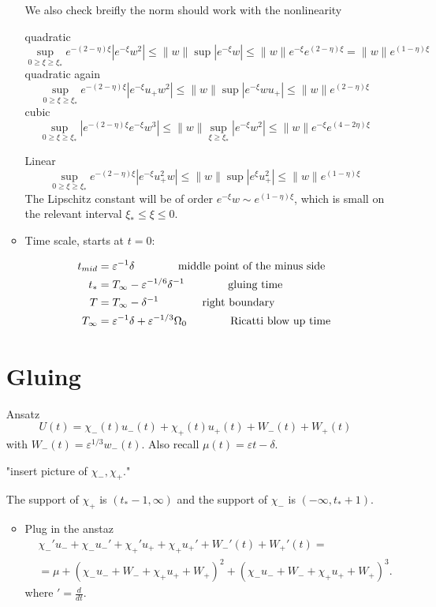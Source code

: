 \documentclass[letterpaper,11pt]{article}
\newcommand{\eps}{\varepsilon}
\numberwithin{equation}{section}
\theoremstyle{plain}
\begin{document}
\begin{enumerate}
\begin{itemize}
We also check breifly the norm should work with the nonlinearity

quadratic
\[
\sup_{0\ge \xi\ge \xi_*} e^{-(2-\eta)\xi}|e^{-\xi}w^2| \le \|w\|\sup |e^{-\xi}w| \le \|w\| e^{-\xi}e^{(2-\eta)\xi} =\|w\|e^{(1-\eta)\xi}
\]
quadratic again
\[
\sup_{0\ge \xi\ge \xi_*} e^{-(2-\eta)\xi}|e^{-\xi}u_+w^2|\le \|w\| \sup |e^{-\xi}w u_+| \le \|w\|e^{(2-\eta)\xi}
\]
cubic
\[
\sup_{0\ge \xi\ge \xi_*} |e^{-(2-\eta)\xi}e^{-\xi}w^3| \le \|w\|\sup_{\xi \ge \xi_*} |e^{-\xi} w^2| \le \|w\| e^{-\xi}e^{(4-2\eta)\xi}
\]

Linear
\[
\sup_{0\ge \xi\ge \xi_*} e^{-(2-\eta)\xi}|e^{-\xi}u_+^2w| \le \|w\| \sup |e^{\xi}u_+^2| \le \|w\|e^{(1-\eta)\xi}
\]
The Lipschitz constant will be of order $e^{-\xi}w \sim e^{(1-\eta)\xi}$, which is small on the relevant interval $\xi_* \le \xi \le 0$.

\item Time scale, starts at $t=0$:

\begin{align*}
t_{mid} &= \eps^{-1}\delta  \hspace{0.5in} \text{ middle point of the minus side}\\
t_* &=  T_\infty - \eps^{-1/6}\delta^{-1} \hspace{0.5in} \text{ gluing time}\\
T & = T_\infty - \delta^{-1} \hspace{0.5in} \text{ right boundary  }\\
T_{\infty} &= \eps^{-1}\delta + \eps^{-1/3}\Omega_0 \hspace{0.5in}  \text{ Ricatti blow up time}
\end{align*}
\pagebreak

\end{itemize}

\section{Gluing}
Ansatz
\[
U(t) = \chi_-(t)u_-(t) + \chi_+(t)u_+(t) + W_-(t)+W_+(t)
\]
with $W_-(t) = \eps^{1/3}w_-(t)$. Also recall $\mu(t) = \eps t- \delta$.

"insert picture of $\chi_-,\chi_+$."

The support of $\chi_+$ is $(t_*-1,\infty)$ and  the support of $\chi_-$ is $(-\infty, t_*+1)$.

\begin{itemize}
\item 
Plug in the anstaz
\begin{align*}
&\chi_-' u_- + \chi_- u_-' + \chi_+' u_+ + \chi_+ u_+' +W_-'(t)+W_+'(t) = \\
&=\mu +(\chi_-u_-+W_-+\chi_+u_+ +W_+)^2 +(\chi_-u_-+W_-+\chi_+u_+ +W_+)^3.
\end{align*}
where $' = \frac{d}{dt}$.


\end{itemize}
\end{enumerate}
\end{document}

